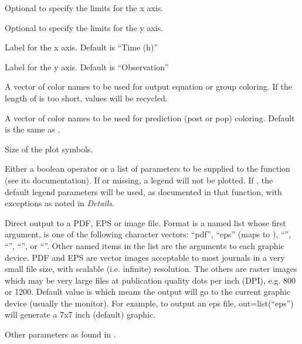 \documentclass[a4paper]{book}
\begin{document}
\begin{Arguments}
\begin{ldescription}
\item[\code{xlim}] Optional to specify the limits for the x axis.

\item[\code{ylim}] Optional to specify the limits for the y axis.

\item[\code{xlab}] Label for the x axis.  Default is ``Time (h)''

\item[\code{ylab}] Label for the y axis.  Default is ``Observation''

\item[\code{col}] A vector of color names to be used for output equation or group coloring.  If the
length of  is too short, values will be recycled.

\item[\code{col.pred}] A vector of color names to be used for prediction (post or pop) coloring.  Default is the same
as .

\item[\code{cex}] Size of the plot symbols.

\item[\code{legend}] Either a boolean operator or a list of parameters to be supplied to the 
function (see its documentation).  If  or missing, a legend will not be plotted.
If , the default legend parameters will be used, as documented in that function, with exceptions
as noted in \emph{Details}.

\item[\code{out}] Direct output to a PDF, EPS or image file.  Format is a named list whose first argument, 
 is one of the following character vectors: ``pdf'', ``eps'' (maps to ),
``'', ``'', ``'', or ``''.  Other named items in the list
are the arguments to each graphic device. PDF and EPS are vector images acceptable to most journals
in a very small file size, with scalable (i.e. infinite) resolution.  The others are raster images which may be very
large files at publication quality dots per inch (DPI), e.g. 800 or 1200. Default value is  which means the 
output will go to the current graphic device (usually the monitor). For example, to output an eps file,
out=list(``eps'') will generate a 7x7 inch (default) graphic.

\item[\code{...}] Other parameters as found in .
\end{ldescription}
\end{Arguments}
\end{document}

